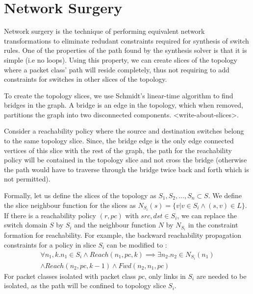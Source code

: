 \section{Network Surgery}
Network surgery is the technique of performing equivalent network transformations to eliminate redudant constraints required for synthesis of switch rules. One of the properties of the path found by the synthesis solver is that it is simple (i.e no loops). Using this property, we can create slices of the topology where a packet class' path will reside completely, thus not requiring to add constraints for switches in other slices of the topology. 

To create the topology slices, we use Schmidt's linear-time algorithm\cite{schmidt} to find bridges in the graph. A bridge is an edge in the topology, which when removed, partitions the graph into two disconnected components. <write-about-slices>. 

Consider a reachability policy where the source and destination switches belong to the same topology slice. Since, the bridge edge is the only edge connected vertices of this slice with the rest of the graph, the path for the reachability policy will be contained in the topology slice and not cross the bridge (otherwise the path would have to traverse through the bridge twice back and forth which is not permitted). 

Formally, let us define the slices of the topology as $S_1, S_2, ..., S_n \subset S$. We define the slice neighbour function for the slices as $N_{S_i}(s) = \{v | v \in S_i \wedge (s,v) \in L\}$. If there is a reachability policy $(r, pc)$ with $src,dst \in S_i$, we can replace the switch domain $S$ by $S_i$ and the neighbour function $N$ by $N_{S_i}$ in the constraint formation for reachability. For example, the backward reachability propagation constraints for a policy in slice $S_i$ can be modified to : 
\begin{multline}
\forall n_1,k.  n_1 \in S_i \wedge Reach(n_1,pc,k) \implies \exists n_2. n_2 \in N_{S_i}(n_1) \\ \wedge  Reach(n_2,pc,k-1) \wedge Fwd(n_2,n_1,pc)
\end{multline}
For packet classes isolated with packet class $pc$, only links in $S_i$ are needed to be isolated, as the path will be confined to topology slice $S_i$. 

